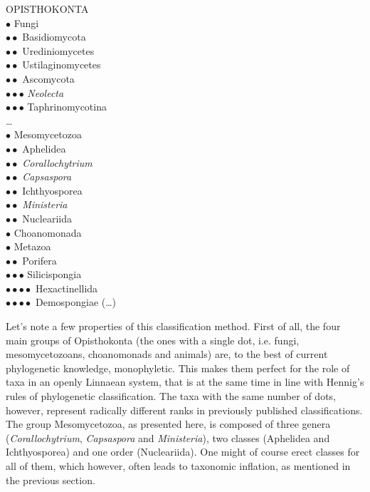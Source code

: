 \begin{artengenv}
\noindent OPISTHOKONTA\\
$\bullet$ Fungi\\
$\bullet\bullet$ Basidiomycota\\
$\bullet\bullet$ Urediniomycetes\\
$\bullet\bullet$ Ustilaginomycetes\\
$\bullet\bullet$ Ascomycota\\
$\bullet\bullet$$\bullet$ \textit{Neolecta}\\
$\bullet\bullet$$\bullet$ Taphrinomycotina\\
\ldots\\
$\bullet$ Mesomycetozoa\\
$\bullet\bullet$ Aphelidea\\
$\bullet\bullet$ \textit{Corallochytrium}\\
$\bullet\bullet$ \textit{Capsaspora}\\
$\bullet\bullet$ Ichthyosporea\\
$\bullet\bullet$ \textit{Ministeria}\\
$\bullet\bullet$ Nucleariida\\
$\bullet$ Choanomonada\\
$\bullet$ Metazoa\\
$\bullet\bullet$ Porifera\\
$\bullet\bullet$$\bullet$ Silicispongia\\
$\bullet\bullet$$\bullet\bullet$ Hexactinellida\\
$\bullet\bullet$$\bullet\bullet$ Demospongiae (\ldots)

\smallskip

Let’s note a few properties of this classification method. First of all, the four main groups of Opisthokonta
(the ones with a single dot, i.e. fungi, mesomycetozoans, choanomonads and animals) are, to the best of current
phylogenetic knowledge, monophyletic. This makes them perfect for the role of taxa in an openly Linnaean system, that
is at the same time in line with Hennig’s rules of phylogenetic classification. The taxa with the same number of dots,
however, represent radically different ranks in previously published classifications. The group Mesomycetozoa, as
presented here, is composed of three genera (\textit{Corallochytrium}, \textit{Capsaspora} and \textit{Ministeria}),
two classes (Aphelidea and Ichthyosporea) and one order (Nucleariida). One might of course erect classes for all of
them, which however, often leads to taxonomic inflation, as mentioned in the previous section.


\end{artengenv}
